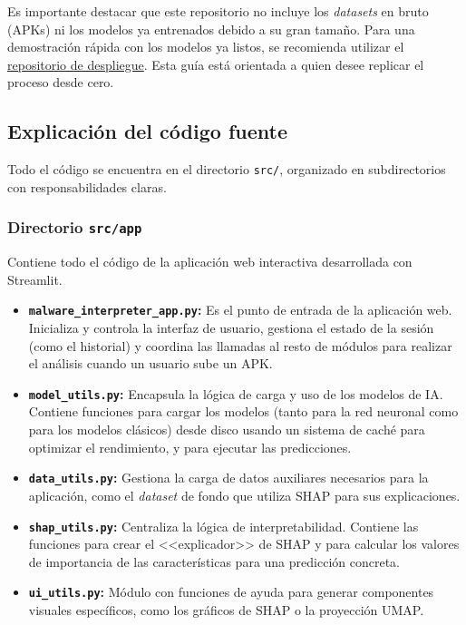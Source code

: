 Es importante destacar que este repositorio no incluye los \textit{datasets} en bruto (APKs) ni los modelos ya entrenados debido a su gran tamaño. Para una demostración rápida con los modelos ya listos, se recomienda utilizar el \href{https://github.com/dtx1007/streamlit_malware_detection_app}{repositorio de despliegue}. Esta guía está orientada a quien desee replicar el proceso desde cero.

\subsection{Explicación del código fuente}
Todo el código se encuentra en el directorio \texttt{src/}, organizado en subdirectorios con responsabilidades claras.

\subsubsection{Directorio \texttt{src/app}}
Contiene todo el código de la aplicación web interactiva desarrollada con Streamlit.


\begin{itemize}
	\item \textbf{\texttt{malware\_interpreter\_app.py}:} Es el punto de entrada de la aplicación web. Inicializa y controla la interfaz de usuario, gestiona el estado de la sesión (como el historial) y coordina las llamadas al resto de módulos para realizar el análisis cuando un usuario sube un APK.
	
	\item \textbf{\texttt{model\_utils.py}:} Encapsula la lógica de carga y uso de los modelos de IA. Contiene funciones para cargar los modelos (tanto para la red neuronal como para los modelos clásicos) desde disco usando un sistema de caché para optimizar el rendimiento, y para ejecutar las predicciones.
	
	\item \textbf{\texttt{data\_utils.py}:} Gestiona la carga de datos auxiliares necesarios para la aplicación, como el \textit{dataset} de fondo que utiliza SHAP para sus explicaciones.
	
	\item \textbf{\texttt{shap\_utils.py}:} Centraliza la lógica de interpretabilidad. Contiene las funciones para crear el <<explicador>> de SHAP y para calcular los valores de importancia de las características para una predicción concreta.
	
	\item \textbf{\texttt{ui\_utils.py}:} Módulo con funciones de ayuda para generar componentes visuales específicos, como los gráficos de SHAP o la proyección UMAP.
\end{itemize}

